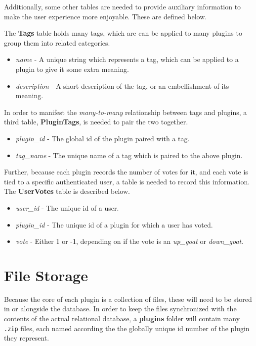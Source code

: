 \documentclass[a4paper, 12pt]{article}
\begin{document}
		Additionally, some other tables are needed to provide auxiliary information to make the user experience more enjoyable. These are defined below.

		The \textbf{Tags} table holds many tags, which are can be applied to many plugins to group them into related categories.

		\begin{itemize}
			\item \emph{name} - A unique string which represents a tag, which can be applied to a plugin to give it some extra meaning.
			\item \emph{description} - A short description of the tag, or an embellishment of its meaning.
		\end{itemize}

		In order to manifest the \emph{many-to-many} relationship between tags and plugins, a third table, \textbf{PluginTags}, is needed to pair the two together.

		\begin{itemize}
			\item \emph{plugin\_id} - The global id of the plugin paired with a tag.
			\item \emph{tag\_name} - The unique name of a tag which is paired to the above plugin.
		\end{itemize}

		Further, because each plugin records the number of votes for it, and each vote is tied to a specific authenticated user, a table is needed to record this information. The \textbf{UserVotes} table is described below.

		\begin{itemize}
			\item \emph{user\_id} - The unique id of a user.
			\item \emph{plugin\_id} - The unique id of a plugin for which a user has voted.
			\item \emph{vote} - Either 1 or -1, depending on if the vote is an \emph{up\_goat} or \emph{down\_goat}.
		\end{itemize}

	\section{File Storage}
		Because the core of each plugin is a collection of files, these will need to be stored in or alongside the database. In order to keep the files synchronized with the contents of the actual relational database, a \textbf{plugins} folder will contain many \verb|.zip| files, each named according the the globally unique id number of the plugin they represent.
\end{document}
